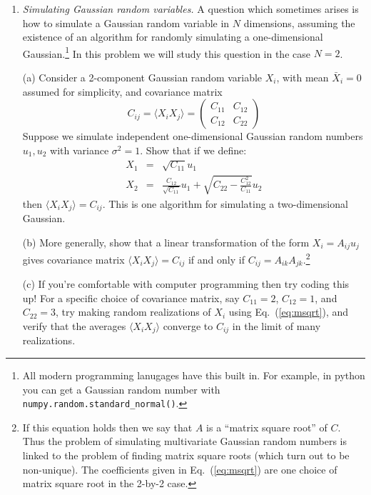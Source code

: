 \documentclass[aps,prd,superscriptaddress,groupedaddress,nofootinbib,nobibnotes]{revtex4}
\newcommand{\be}{\begin{equation}}
\newcommand{\ee}{\end{equation}}
\newcommand{\ba}{\begin{eqnarray}}
\newcommand{\ea}{\end{eqnarray}}
\newcommand{\nn}{\nonumber}
\begin{document}
\begin{enumerate}
\item {\em Simulating Gaussian random variables.}
A question which sometimes arises is how to simulate a Gaussian random variable in $N$ dimensions,
assuming the existence of an algorithm for randomly simulating a one-dimensional Gaussian.\footnote{All
modern programming lanugages have this built in.  For example, in python you can get a Gaussian random number
with {\tt numpy.random.standard\_normal()}.}  In this problem we will study this question in the case $N=2$.
\par\medskip
(a) 
Consider a 2-component Gaussian random variable $X_i$, with mean $\bar X_i = 0$ assumed for simplicity,
and covariance matrix
\be
C_{ij} = \langle X_i X_j \rangle = \left( \begin{array}{cc}
 C_{11} & C_{12} \\
 C_{12} & C_{22}
\end{array} \right)
\ee
Suppose we simulate independent one-dimensional Gaussian random numbers $u_1, u_2$ with variance $\sigma^2=1$.
Show that if we define:
\ba
X_1 &=& \sqrt{C_{11}} u_1 \nn \\
X_2 &=& \frac{C_{12}}{\sqrt{C_{11}}} u_1 + \sqrt{ C_{22} - \frac{C_{12}^2}{C_{11}}} u_2  \label{eq:msqrt}
\ea
then $\langle X_i X_j \rangle = C_{ij}$.  This is one algorithm for simulating a two-dimensional Gaussian.
\par\medskip
(b) More generally, show that a linear transformation of the form $X_i = A_{ij} u_j$ gives covariance
matrix $\langle X_i X_j \rangle = C_{ij}$ if and only if $C_{ij} = A_{ik} A_{jk}$.\footnote{If this equation
holds then we say that $A$ is a ``matrix square root'' of $C$.  Thus the problem of simulating multivariate
Gaussian random numbers is linked to the problem of finding matrix square roots (which turn out to be non-unique).  
The coefficients given in Eq.~(\ref{eq:msqrt}) are one choice of matrix square root in the 2-by-2 case.}
\par\medskip
(c) If you're comfortable with computer programming then try coding this up!  For a specific choice of
covariance matrix, say $C_{11}=2$, $C_{12}=1$, and $C_{22}=3$, try making random realizations
of $X_i$ using Eq.~(\ref{eq:msqrt}), and verify that the averages $\langle X_i X_j \rangle$ converge to $C_{ij}$
in the limit of many realizations.


\end{enumerate}
\end{document}
